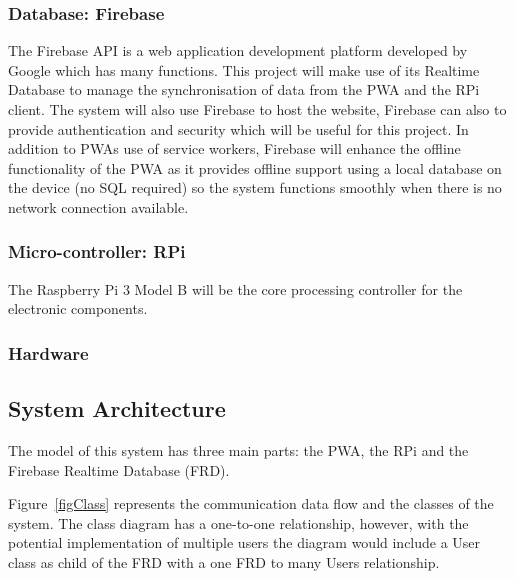 \documentclass[final]{cmpreport}
\begin{document}
        
        \subsubsection{Database: Firebase}
        
        The Firebase API is a web application development platform developed by Google which has many functions. This project will make use of its Realtime Database to manage the synchronisation of data from the PWA and the RPi client. The system will also use Firebase to host the website, Firebase can also to provide authentication and security which will be useful for this project. In addition to PWAs use of service workers, Firebase will enhance the offline functionality of the PWA as it provides offline support using a local database on the device (no SQL required) so the system functions smoothly when there is no network connection available. 
        
        
        \subsubsection{Micro-controller: RPi}
        
        The Raspberry Pi 3 Model B will be the core processing controller for the electronic components.
        
        
        \subsubsection{Hardware}
        

    \subsection{System Architecture}
    
    

    The model of this system has three main parts: the PWA, the RPi and the Firebase Realtime Database (FRD).
    
    Figure~\ref{figClass} represents the communication data flow and the classes of the system. The class diagram has a one-to-one relationship, however, with the potential implementation of multiple users the diagram would include a User class as child of the FRD with a one FRD to many Users relationship.
    
\end{document}
